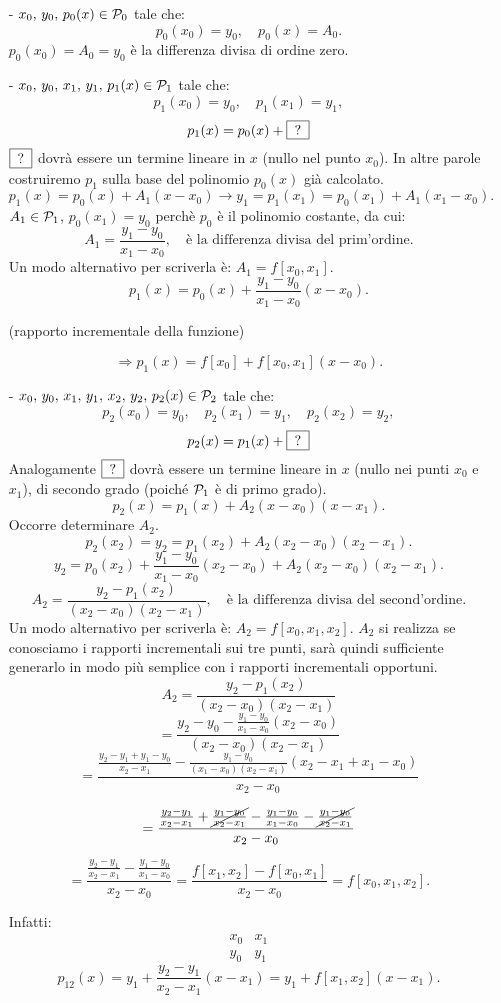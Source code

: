 \begin{itemize}
\item[-]$x_0,\, y_0,\, p_0(x) \in \mathcal{P}_0$ tale che:
\[p_0(x_0) = y_0, \quad p_0(x) = A_0.\]
$p_0(x_0) = A_0 = y_0$ è la differenza divisa di ordine zero.

\item[-]$x_0,\, y_0,\, x_1,\, y_1,\, p_1(x) \in \mathcal{P}_1$ tale che:
\[p_1(x_0) = y_0, \quad p_1(x_1) = y_1,\]
\[p_1(x) = p_0(x) + \framebox[3.5\width]{\textrm{?}}\]
$\framebox[3.5\width]{\textrm{?}}$ dovrà essere un termine lineare in $x$
(nullo nel punto $x_0$). In altre parole costruiremo $p_1$ sulla base del
polinomio $p_0(x)$ già calcolato.
\[p_1(x) = p_0(x) + A_1(x-x_0) \rightarrow y_1 = p_1(x_1) = p_0(x_1) +
A_1(x_1-x_0).\]
$A_1 \in \mathcal{P}_1$, $p_0(x_1) = y_0$ perchè $p_0$ è il polinomio costante, da cui:
\[
A_1 = \frac{y_1 - y_0}{x_1 - x_0}, \quad \textrm{è la differenza divisa del
prim'ordine.}
\]
Un modo alternativo per scriverla è: $A_1 = f[x_0,x_1]$.
\[p_1(x) = p_0(x) +\frac{y_1 - y_0}{x_1 - x_0}(x-x_0).\]
\begin{center}(rapporto incrementale della funzione)\end{center}
\[\Longrightarrow p_1(x) = f[x_0] + f[x_0,x_1](x-x_0).\]

\item[-]$x_0,\, y_0,\, x_1,\, y_1,\, x_2,\, y_2,\, p_2(x) \in \mathcal{P}_2$ tale che:
\[p_2(x_0) = y_0, \quad p_2(x_1) = y_1, \quad p_2(x_2) = y_2,\]
\[p_2(x) = p_1(x) + \framebox[3.5\width]{\textrm{?}}\]
Analogamente $\framebox[3.5\width]{\textrm{?}}$ dovrà essere un termine
lineare in $x$ (nullo nei punti $x_0$ e $x_1$), di secondo grado (poiché
$\mathcal{P}_1$ è di primo grado).
\[p_2(x) = p_1(x) + A_2(x-x_0)(x-x_1).\]
Occorre determinare $A_2$.
\[p_2(x_2) = y_2 = p_1(x_2) + A_2(x_2-x_0)(x_2-x_1).\]
\[
y_2 = p_0(x_2) + \frac{y_1 - y_0}{x_1 - x_0}(x_2-x_0) + A_2(x_2-x_0)(x_2-x_1).
\]
\[
A_2 = \frac{y_2 - p_1(x_2)}{(x_2 - x_0)(x_2 - x_1)},
\quad \textrm{è la differenza divisa del
second'ordine.}
\]
Un modo alternativo per scriverla è: $A_2 = f[x_0,x_1,x_2]$.
$A_2$ si realizza se conosciamo i rapporti incrementali sui tre punti, sarà
quindi sufficiente generarlo in modo più semplice con i rapporti incrementali
opportuni.
\[A_2  =  \frac{y_2 - p_1(x_2)}{(x_2 - x_0)(x_2 - x_1)} \]
\[ =  \frac{y_2 - y_0 - \frac{y_1-y_0}{x_1-x_0}(x_2-x_0)}{(x_2-x_0)(x_2-x_1)}\]
\[ =  \frac{\frac{y_2-y_1+y_1-y_0}{x_2-x_1}-\frac{y_1-y_0}{(x_1-x_0)(x_2-x_1)}
(x_2-x_1+x_1-x_0)}{x_2-x_0}\]

\[=
\frac{\frac{y_2 - y_1}{x_2 - x_1} + \cancel{\frac{y_1 - y_0}{x_2 - x_1}} -
\frac{y_1 - y_0}{x_1 - x_0} -\cancel{\frac{y_1 - y_0}{x_2 - x_1}}}{x_2-x_0}
\]

\[=
\frac{\frac{y_2 - y_1}{x_2 - x_1}- \frac{y_1 - y_0}{x_1 - x_0}}{x_2-x_0}
=
\frac{f[x_1,x_2]-f[x_0,x_1]}{x_2-x_0} = f[x_0,x_1,x_2].
\]

Infatti:
\[\begin{array}{cc}
x_0 & x_1  \\
y_0 & y_1
\end{array}\]
\[
p_{12}(x) = y_1 + \frac{y_2-y_1}{x_2-x_1}(x-x_1) = y_1 + f[x_1,x_2](x-x_1).
\]
\end{itemize}

